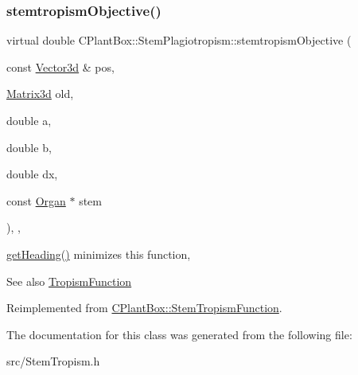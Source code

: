 \subsubsection{\texorpdfstring{stemtropism\+Objective()}{stemtropismObjective()}}
{\footnotesize\ttfamily virtual double C\+Plant\+Box\+::\+Stem\+Plagiotropism\+::stemtropism\+Objective (\begin{DoxyParamCaption}\item[{const \hyperlink{classCPlantBox_1_1Vector3d}{Vector3d} \&}]{pos,  }\item[{\hyperlink{classCPlantBox_1_1Matrix3d}{Matrix3d}}]{old,  }\item[{double}]{a,  }\item[{double}]{b,  }\item[{double}]{dx,  }\item[{const \hyperlink{classCPlantBox_1_1Organ}{Organ} $\ast$}]{stem }\end{DoxyParamCaption})\hspace{0.3cm}{\ttfamily [inline]}, {\ttfamily [override]}, {\ttfamily [virtual]}}



\hyperlink{classCPlantBox_1_1StemTropismFunction_ac72f7ad1200d1defbb3c9b20e20d1f62}{get\+Heading()} minimizes this function, 

\begin{DoxySeeAlso}{See also}
\hyperlink{classCPlantBox_1_1TropismFunction}{Tropism\+Function} 
\end{DoxySeeAlso}


Reimplemented from \hyperlink{classCPlantBox_1_1StemTropismFunction_a86dc37330cbec72042352dcce88756ae}{C\+Plant\+Box\+::\+Stem\+Tropism\+Function}.



The documentation for this class was generated from the following file\+:\begin{DoxyCompactItemize}
\item 
src/Stem\+Tropism.\+h\end{DoxyCompactItemize}
